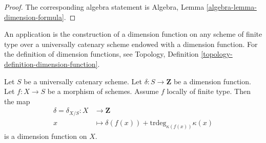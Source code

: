 \begin{proof}
The corresponding algebra statement is
Algebra, Lemma \ref{algebra-lemma-dimension-formula}.
\end{proof}

\noindent
An application is the construction of a dimension function
on any scheme of finite type over a universally catenary
scheme endowed with a dimension function. For the definition
of dimension functions, see
Topology, Definition \ref{topology-definition-dimension-function}.

\begin{lemma}
\label{lemma-dimension-function-propagates}
Let $S$ be a universally catenary scheme.
Let $\delta : S \to \mathbf{Z}$ be a dimension function.
Let $f : X \to S$ be a morphism of schemes.
Assume $f$ locally of finite type.
Then the map
\begin{align*}
\delta = \delta_{X/S} : X & \longrightarrow \mathbf{Z} \\
x & \longmapsto \delta(f(x)) + \text{trdeg}_{\kappa(f(x))} \kappa(x)
\end{align*}
is a dimension function on $X$.
\end{lemma}

